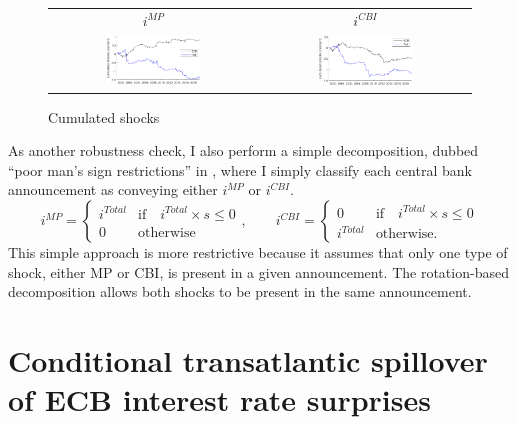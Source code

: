 \documentclass[a4paper,12pt]{article}
\begin{document}
\begin{figure}[!htbp]
\caption{Cumulated shocks}\label{fig: cumulated shocks}
\begin{center}
\begin{tabular}{cc}
\small $i^{MP}$ & \small $i^{CBI}$ \\
\includegraphics[width=0.47\textwidth]{figures/cumulated_mp_median} &
\includegraphics[width=0.47\textwidth]{figures/cumulated_cbi_median}\\
\end{tabular}
\end{center}
\end{figure}

As another robustness check, I also perform a simple decomposition, dubbed ``poor man's sign restrictions'' in \cite{Jarocinski_Karadi_2020}, where
I simply classify each central bank announcement as conveying either $i^{MP}$ or $i^{CBI}$.
\begin{equation}
i^{MP} = \begin{cases} i^{Total} &\text{if} \quad  i^{Total}\times s\le0\\ 0 &\text{otherwise}\end{cases},\qquad
i^{CBI} = \begin{cases} 0 &\text{if} \quad  i^{Total}\times s\le0\\ i^{Total} &\text{otherwise.}\end{cases}
\end{equation}
This simple approach is more restrictive because it assumes that only one type of shock, either
MP or CBI, is present in a given announcement. The rotation-based decomposition
allows both shocks to be present in the same announcement.

\section{Conditional transatlantic spillover of ECB interest rate surprises}
\end{document}
